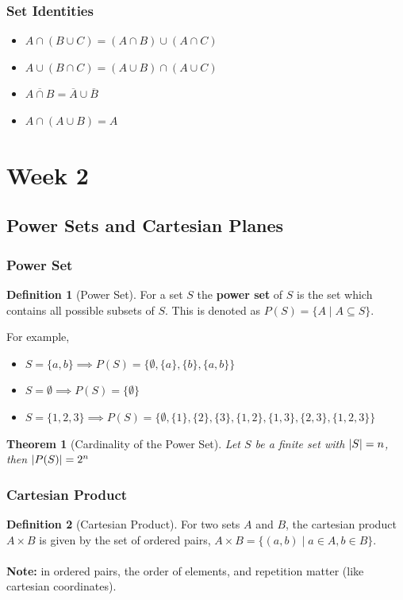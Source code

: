 \documentclass[12pt]{article}
\DeclarePairedDelimiter\abs{\lvert}{\rvert}
\newcommand{\compline}[1]{\overline{#1}}
\newtheorem{theorem}{Theorem}
\theoremstyle{definition}
\newtheorem{definition}{Definition}
\begin{document}
            \subsubsection{Set Identities}
            \begin{itemize}
                \item $A \cap (B \cup C) = (A \cap B) \cup (A \cap C)$
                \item $A \cup (B \cap C) = (A \cup B) \cap (A \cup C)$
                \item $\compline{A \cap B} = \compline{A} \cup \compline{B}$
                \item $A \cap (A \cup B) = A$
            \end{itemize}

    \newpage
    \section{Week 2}
    \subsection{Power Sets and Cartesian Planes}
    \subsubsection{Power Set}
    \begin{definition}[Power Set]
        \label{power-set}
        For a set $S$ the \textbf{power set} of $S$ is the set which contains all possible
        subsets of $S$. This is denoted as $P(S) = \{A \mid A \subseteq S\}$.
    \end{definition}
    For example,
    \begin{itemize}
        \item $S = \{a, b\} \implies P(S) = \{\emptyset, \{a\}, \{b\}, \{a,b\}\}$
        \item $S = \emptyset \implies P(S) = \{\emptyset\}$
        \item $S = \{1,2,3\} \implies P(S) = \{\emptyset, \{1\},\{2\},\{3\},\{1,2\},\{1,3\}, \{2,3\},\{1,2,3\}\}$ \\
    \end{itemize}

    \begin{theorem}[Cardinality of the Power Set]
        Let $S$ be a finite set with $\abs{S}=n$, then $\abs{P(S)}=2^{n}$
    \end{theorem}

    \subsubsection{Cartesian Product}
    \begin{definition}[Cartesian Product]
        \label{def:cartesian-product}
        For two sets $A$ and $B$, the cartesian product $A \times B$ is given by the
        set of ordered pairs, $A \times B = \{(a, b) \mid a \in A, b \in B \}$.\\\\
        \textbf{Note:} in ordered pairs, the order of elements, and repetition matter
        (like cartesian coordinates).
    \end{definition}
\end{document}
